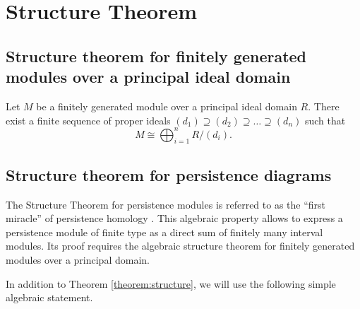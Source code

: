 \chapter{Structure Theorem}
\section{Structure theorem for finitely generated modules over a principal ideal domain}

\begin{theorem} \label{theorem:structure}
    Let $ M $ be a  finitely generated module over a principal ideal domain $R$. There exist a finite sequence of proper ideals $ (d_1) \supseteq (d_2) \supseteq \dots \supseteq (d_n) $ such that
    $$
        M \cong \bigoplus_{i=1}^n R / (d_i).
    $$
\end{theorem}

\section{Structure theorem for persistence diagrams}
The Structure Theorem for persistence modules is referred to as the ``first miracle'' of persistence homology \cite{nanda}. This algebraic property allows to express a persistence module of finite type as a direct sum of finitely many interval modules. Its proof requires the algebraic structure theorem for finitely generated modules over a principal domain.


In addition to Theorem \ref{theorem:structure}, we will use the following simple algebraic statement.

